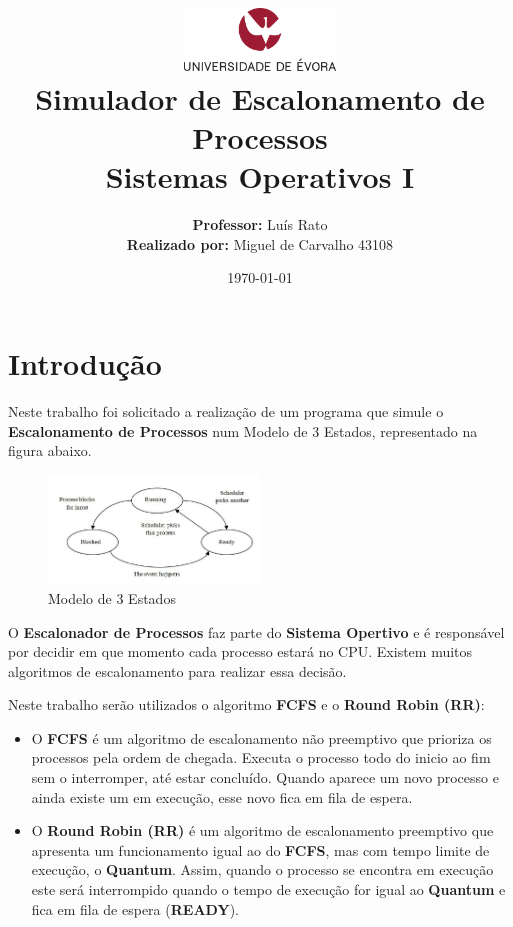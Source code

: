 \documentclass[11pt]{article}   %
\title
{
    \includegraphics[width=0.3\textwidth]{images/logo_universidade.png}
    \\[0.1cm]
    \textbf{Simulador de Escalonamento de Processos} \\
    Sistemas Operativos I
}
\author
{
    \textbf{Professor:} Luís Rato \\
    \textbf{Realizado por:} Miguel de Carvalho 43108 
}
\date{\today}
\begin{document}
\maketitle

\section{Introdução} 

\hspace{0,5cm}Neste trabalho foi solicitado a realização de um programa que simule o \textbf{Escalonamento de Processos} num Modelo de 3 Estados, representado na figura abaixo. \par
\begin{figure}[h!]
    \begin{center}
        \includegraphics[width=0.5\textwidth]{images/states.png}
        \caption{Modelo de 3 Estados}
    \end{center}
\end{figure}
O \textbf{Escalonador de Processos} faz parte do \textbf{Sistema Opertivo} e é responsável por decidir em que momento cada processo estará no CPU. 
Existem muitos algoritmos de escalonamento para realizar essa decisão. \par
Neste trabalho serão utilizados o algoritmo \textbf{FCFS} e o \textbf{Round Robin (RR)}:
\begin{itemize}
    \item O \textbf{FCFS} é um algoritmo de escalonamento não preemptivo que prioriza os processos pela ordem de chegada. Executa o processo todo do inicio ao fim sem o interromper, até estar concluído. Quando aparece um novo processo e ainda existe um em execução, esse novo fica em fila de espera.
    \item O \textbf{Round Robin (RR)} é um algoritmo de escalonamento preemptivo que apresenta um funcionamento igual ao do \textbf{FCFS}, mas com tempo limite de execução, o \textbf{Quantum}. Assim, quando o processo se encontra em execução este será interrompido quando o tempo de execução for igual ao \textbf{Quantum} e fica em fila de espera (\textbf{READY}). 
\end{itemize}
\end{document}
